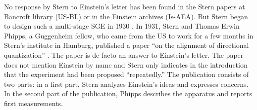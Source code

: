 \documentclass[12pt]{article}
\begin{document}
No response by Stern to Einstein's letter has been found in the Stern papers at Bancroft library (US-BL) or in the Einstein archives (Is-AEA). But Stern began to design such a multi-stage SGE in 1930 \cite[p.~186]{PhippsTEtal1932Einstellung}. In 1931, Stern and Thomas Erwin Phipps, a Guggenheim fellow, who came from the US to work for a few months in Stern's institute in Hamburg, published a paper ``on the alignment of directional quantization''   
\citep{PhippsTEtal1932Einstellung}.
The paper is de-facto an answer to Einstein's letter. The paper does not mention Einstein by name and Stern only indicates in the introduction that the experiment had been proposed ``repeatedly.'' The publication consists of two parts: in a first part, Stern analyzes Einstein's ideas and expresses concerns. In the second part of the publication, Phipps describes the apparatus and reports first measurements.
\end{document}
